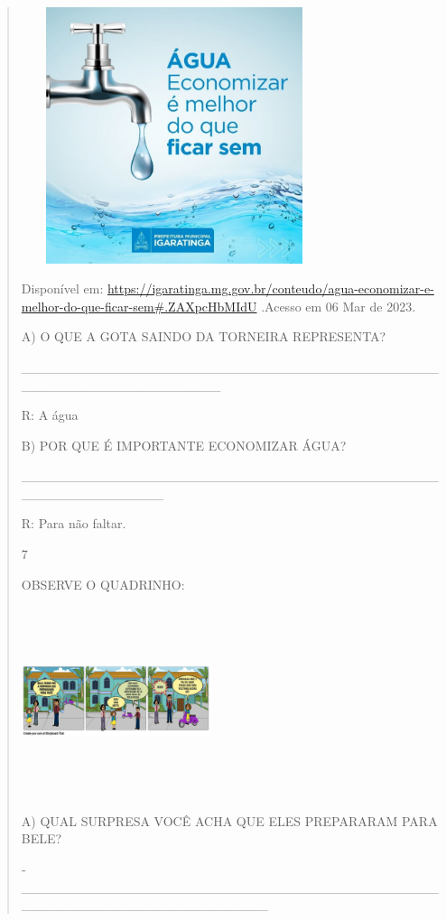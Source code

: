 \begin{verse}
{{{\includegraphics[width=3.52778in,height=2.95347in]{media/image133.jpeg}

Disponível em:
\url{https://igaratinga.mg.gov.br/conteudo/agua-economizar-e-melhor-do-que-ficar-sem\#.ZAXpcHbMIdU}
.Acesso em 06 Mar de 2023.

A) O QUE A GOTA SAINDO DA TORNEIRA REPRESENTA?

\_\_\_\_\_\_\_\_\_\_\_\_\_\_\_\_\_\_\_\_\_\_\_\_\_\_\_\_\_\_\_\_\_\_\_\_\_\_\_\_\_\_\_\_\_\_\_\_\_\_\_\_\_\_\_\_\_\_\_\_\_\_\_\_\_

R: A água

B) POR QUE É IMPORTANTE ECONOMIZAR ÁGUA?

\_\_\_\_\_\_\_\_\_\_\_\_\_\_\_\_\_\_\_\_\_\_\_\_\_\_\_\_\_\_\_\_\_\_\_\_\_\_\_\_\_\_\_\_\_\_\_\_\_\_\_\_\_\_\_\_\_\_\_

R: Para não faltar.

\num{7}

OBSERVE O QUADRINHO:

\includegraphics[width=2.17917in,height=2.18750in]{media/image129.png}

A) QUAL SURPRESA VOCÊ ACHA QUE ELES PREPARARAM PARA BELE?

­­­­­­­­­­­­­­­­­­­­­­­\_\_\_\_\_\_\_\_\_\_\_\_\_\_\_\_\_\_\_\_\_\_\_\_\_\_\_\_\_\_\_\_\_\_\_\_\_\_\_\_\_\_\_\_\_\_\_\_\_\_\_\_\_\_\_\_\_\_\_\_\_\_\_\_\_\_\_\_\_\_

}}}
\end{verse}
